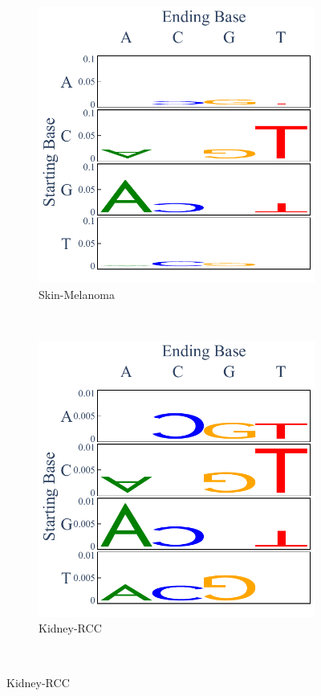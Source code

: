 \begin{figure}[htbp]
    \begin{subfigure}{.5\textwidth}
    \includegraphics[scale=0.7]{graphics/spectra_Skin-Melanoma.pdf}
    \caption{Skin-Melanoma}
    \label{fig:spectra_skin}
    \end{subfigure}
    ~
    \begin{subfigure}{.5\textwidth}
    
    \includegraphics[scale=0.7]{graphics/spectra_Kidney-RCC.pdf}
    \caption{Kidney-RCC}
    \label{fig:spectra_kidney}
    \end{subfigure} \\
    \vspace{0.5cm}
    

\end{figure}
